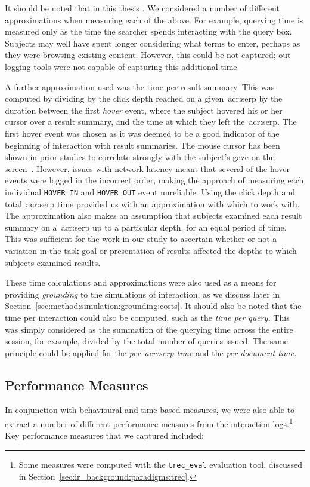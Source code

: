 It should be noted that in this thesis . We considered a number of different approximations when measuring each of the above. For example, querying time is measured only as the time the searcher spends interacting with the query box. Subjects may well have spent longer considering what terms to enter, perhaps as they were browsing existing content. However, this could be not captured; out logging tools were not capable of capturing this additional time.

A further approximation used was the time per result summary. This was computed by dividing by the click depth reached on a given~\gls{acr:serp} by the duration between the first \emph{hover} event, where the subject hovered his or her cursor over a result summary, and the time at which they left the~\gls{acr:serp}. The first hover event was chosen as it was deemed to be a good indicator of the beginning of interaction with result summaries. The mouse cursor has been shown in prior studies to correlate strongly with the subject's gaze on the screen~\citep{chen2001mouse_cursor, smucker2014judging_relevance_movements}. However, issues with network latency meant that several of the hover events were logged in the incorrect order, making the approach of measuring each individual \texttt{HOVER\_IN} and \texttt{HOVER\_OUT} event unreliable. Using the click depth and total~\gls{acr:serp} time provided us with an approximation with which to work with. The approximation also makes an assumption that subjects examined each result summary on a~\gls{acr:serp} up to a particular depth, for an equal period of time. This was sufficient for the work in our study to ascertain whether or not a variation in the task goal or presentation of results affected the depths to which subjects examined results.

These time calculations and approximations were also used as a means for providing \emph{grounding} to the simulations of interaction, as we discuss later in Section~\ref{sec:method:simulation:grounding:costs}. It should also be noted that the time per interaction could also be computed, such as the \emph{time per query.} This was simply considered as the summation of the querying time across the entire session, for example, divided by the total number of queries issued. The same principle could be applied for the \emph{per~\gls{acr:serp} time} and the \emph{per document time.}

\subsection{Performance Measures}\label{sec:methodology:extracting:performance}
In conjunction with behavioural and time-based measures, we were also able to extract a number of different performance measures from the interaction logs.\footnote{Some measures were computed with the \texttt{trec\_eval} evaluation tool, discussed in Section~\ref{sec:ir_background:paradigms:trec}.} Key performance measures that we captured included:

